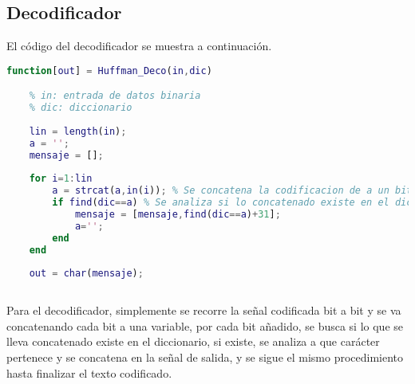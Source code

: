 \subsection{Decodificador}

El código del decodificador se muestra a continuación.

\begin{lstlisting}[language=Matlab,breaklines = true,frame      = false]
    function[out] = Huffman_Deco(in,dic)

    % in: entrada de datos binaria
    % dic: diccionario
    
    lin = length(in);
    a = '';
    mensaje = [];
    
    for i=1:lin
        a = strcat(a,in(i)); % Se concatena la codificacion de a un bit
        if find(dic==a) % Se analiza si lo concatenado existe en el diccionario
            mensaje = [mensaje,find(dic==a)+31];
            a='';
        end
    end
    
    out = char(mensaje);
   
\end{lstlisting}

Para el decodificador, simplemente se recorre la señal codificada bit a bit y se va concatenando cada bit a una variable, por cada bit añadido, se busca si lo que se lleva concatenado existe en el diccionario, si existe, se analiza a que carácter pertenece y se concatena en la señal de salida, y se sigue el mismo procedimiento hasta finalizar el texto codificado.

